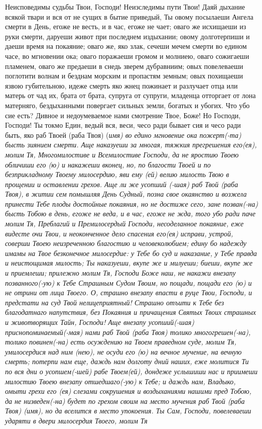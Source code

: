 \mychapterending




Неисповедимы судьбы Твои, Господи! Неизследимы пути Твои! Даяй дыхание всякой твари и вся от не сущих в бытие приведый, Ты овому посылаеши Ангела смерти в День, егоже не весть, и в час, егоже не чает; оваго же исхищаеши из руки смерти, даруеши живот при последнем издыхании; овому долготерпиши и даеши время на покаяние; оваго же, яко злак, сечеши мечем смерти во едином часе, во мгновении ока; оваго поражаеши громом и молниею, оваго сожигаеши пламенем, оваго же предаеши в снедь зверем дубравниим; овых повелеваеши поглотити волнам и безднам морским и пропастям земным; овых похищаеши язвою губительною, идеже смерть яко жнец пожинает и разлучает отца или матерь от чад их, брата от брата, супруга от супруги, младенца отторгает от лона матерняго, бездыханными повергает сильных земли, богатых и убогих. Что убо сие есть? Дивное и недоумеваемое нами смотрение Твое, Боже! Но Господи, Господи! Ты токмо Един, ведый вся, веси, чесо ради бывает сия и чесо ради быть, яко раб Твоей (раба Твоя) (\itshape имя\normalfont{}) во едино мгновение ока пожерт(-та) бысть зиянием смерти. Аще наказуеши за многая, тяжкия прегрешения его(ея), молим Тя, Многомилостиве и Всемилостиве Господи, да не яростию Твоею обличиши его (ю) и накажеши вконец, но, по благости Твоей и по безприкладному Твоему милосердию, яви ему (ей) велию милость Твою в прощении и оставлении грехов. Аще ли же усопший (-шая) раб Твой (раба Твоя), в житии сем помышляя День Судный, позна свое окаянство и возжела принести Тебе плоды достойные покаяния, но не достиже сего, зане позван(-на) бысть Тобою в день, егоже не веда, и в час, егоже не жда, того убо ради паче молим Тя, Преблагий и Премилосердый Господи, несоделанное покаяние, еже видесте очи Твои, и неоконченное дело спасения его(ея) исправи, устрой, соверши Твоею неизреченною благостию и человеколюбием; едину бо надежду имамы на Твое безконечное милосердие: у Тебе бо суд и наказание, у Тебе правда и неистощимая милость; Ты наказуеши, вкупе же и милуеши; биеши, вкупе же и приемлеши; прилежно молим Тя, Господи Боже наш, не накажи внезапу позванного(-ую) к Тебе Страшным Судом Твоим, но пощади, пощади его (ю) и не отрини от лица Твоего. О, страшно внезапу впасти в руце Твои, Господи, и предстати на суд Твой нелицеприятный! Страшно отъити к Тебе без благодатнаго напутствия, без Покаяния и причащения Святых Твоих страшных и животворящих Тайн, Господи! Аще внезапу усопший(-шая) приснопоминаемый(-мая) нами раб Твой (раба Твоя) толико многогрешен(-на), толико повинен(-на) есть осуждению на Твоем праведном суде, молим Тя, умилосердися над ним (нею), не осуди его (ю) на вечное мучение, на вечную смерть; потерпи нам еще, даждь нам долготу дний наших, еже молитися Ти по вся дни о усопшем(-шей) рабе Твоем(ей), дондеже услышиши нас и приимеши милостию Твоею внезапу отшедшаго(-ую) к Тебе; и даждь нам, Владыко, омыти грехи его (ея) слезами сокрушения и воздыханиями нашими пред Тобою, да не низведен(-на) будет по грехом своим на место мучения раб Твой (раба Твоя) (имя), но да вселится в место упокоения. Ты Сам, Господи, повелеваеши ударяти в двери милосердия Твоего, молим Тя 